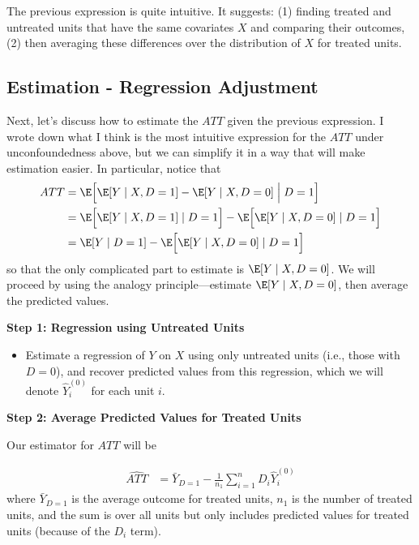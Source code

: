 \documentclass[
  letterpaper,
  DIV=11,
  numbers=noendperiod]{scrreprt}
\providecommand{\tightlist}{%
  \setlength{\itemsep}{0pt}\setlength{\parskip}{0pt}}\usepackage{longtable,booktabs,array}
\begin{document}
The previous expression is quite intuitive. It suggests: (1) finding
treated and untreated units that have the same covariates \(X\) and
comparing their outcomes, (2) then averaging these differences over the
distribution of \(X\) for treated units.

\subsection{Estimation - Regression
Adjustment}\label{estimation---regression-adjustment}

Next, let's discuss how to estimate the \(ATT\) given the previous
expression. I wrote down what I think is the most intuitive expression
for the \(ATT\) under unconfoundedness above, but we can simplify it in
a way that will make estimation easier. In particular, notice that
\begin{align*}
  ATT &= \E\Big[\E[Y \mid X, D=1] - \E[Y \mid X, D=0] \Bigm| D=1\Big] \\
  &= \E\Big[\E[Y \mid X, D=1] \mid D=1\Big] - \E\Big[\E[Y \mid X, D=0] \mid D=1\Big] \\
  &= \E[Y \mid D=1] - \E\Big[\E[Y \mid X, D=0] \mid D=1\Big]
\end{align*} so that the only complicated part to estimate is
\(\E[Y \mid X, D=0]\). We will proceed by using the analogy
principle---estimate \(\E[Y \mid X, D=0]\), then average the predicted
values.

\textbf{Step 1: Regression using Untreated Units}

\begin{itemize}
\tightlist
\item
  Estimate a regression of \(Y\) on \(X\) using only untreated units
  (i.e., those with \(D=0\)), and recover predicted values from this
  regression, which we will denote \(\hat{Y}_i^{(0)}\) for each unit
  \(i\).
\end{itemize}

\textbf{Step 2: Average Predicted Values for Treated Units}

Our estimator for \(ATT\) will be

\begin{align*}
  \widehat{ATT} &= \bar{Y}_{D=1} - \frac{1}{n_1} \sum_{i=1}^n D_i \hat{Y}_i^{(0)}
\end{align*} where \(\bar{Y}_{D=1}\) is the average outcome for treated
units, \(n_1\) is the number of treated units, and the sum is over all
units but only includes predicted values for treated units (because of
the \(D_i\) term).
\end{document}
